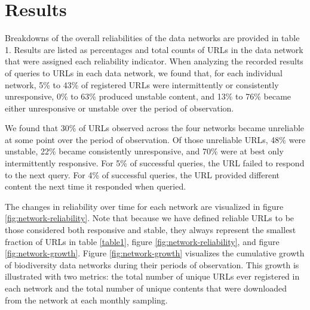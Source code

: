 % 



\section*{Results}
\label{sec:results}
Breakdowns of the overall reliabilities of the data networks are provided in table 1. Results are listed as percentages and total counts of URLs in the data network that were assigned each reliability indicator. When analyzing the recorded results of queries to URLs in each data network, we found that, for each individual network, 5\% to 43\% of registered URLs were intermittently or consistently unresponsive, 0\% to 63\% produced unstable content, and 13\% to 76\% became either unresponsive or unstable over the period of observation.

We found that 30\% of URLs observed across the four networks became unreliable at some point over the period of observation. Of those unreliable URLs, 48\% were unstable, 22\% became consistently unresponsive, and 70\% were at best only intermittently responsive. For 5\% of successful queries, the URL failed to respond to the next query. For 4\% of successful queries, the URL provided different content the next time it responded when queried.

The changes in reliability over time for each network are visualized in figure \ref{fig:network-reliability}. Note that because we have defined reliable URLs to be those considered both responsive and stable, they always represent the smallest fraction of URLs in table \ref{table1}, figure \ref{fig:network-reliability}, and figure \ref{fig:network-growth}. Figure \ref{fig:network-growth} visualizes the cumulative growth of biodiversity data networks during their periods of observation. This growth is illustrated with two metrics: the total number of unique URLs ever registered in each network and the total number of unique contents that were downloaded from the network at each monthly sampling.

% 


% 

